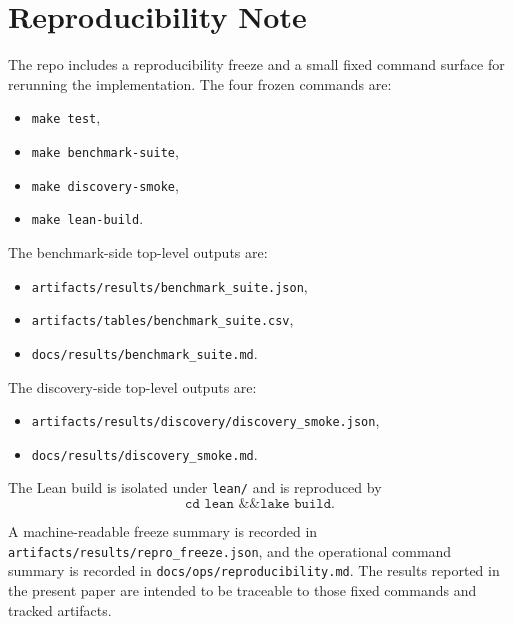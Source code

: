 \documentclass[11pt]{article}
\theoremstyle{definition}
\begin{document}
\section{Reproducibility Note}\label{app:reproducibility}
The repo includes a reproducibility freeze and a small fixed command surface for rerunning the implementation. The four frozen commands are:
\begin{itemize}
\item \texttt{make test},
\item \texttt{make benchmark-suite},
\item \texttt{make discovery-smoke},
\item \texttt{make lean-build}.
\end{itemize}
The benchmark-side top-level outputs are:
\begin{itemize}
\item \texttt{artifacts/results/benchmark\_suite.json},
\item \texttt{artifacts/tables/benchmark\_suite.csv},
\item \texttt{docs/results/benchmark\_suite.md}.
\end{itemize}
The discovery-side top-level outputs are:
\begin{itemize}
\item \texttt{artifacts/results/discovery/discovery\_smoke.json},
\item \texttt{docs/results/discovery\_smoke.md}.
\end{itemize}
The Lean build is isolated under \texttt{lean/} and is reproduced by
\[
\texttt{cd lean \&\& lake build}.
\]

A machine-readable freeze summary is recorded in
\texttt{artifacts/results/repro\_freeze.json}, and the operational command summary is recorded in
\texttt{docs/ops/reproducibility.md}. The results reported in the present paper are intended to be traceable to those fixed commands and tracked artifacts.



\end{document}
